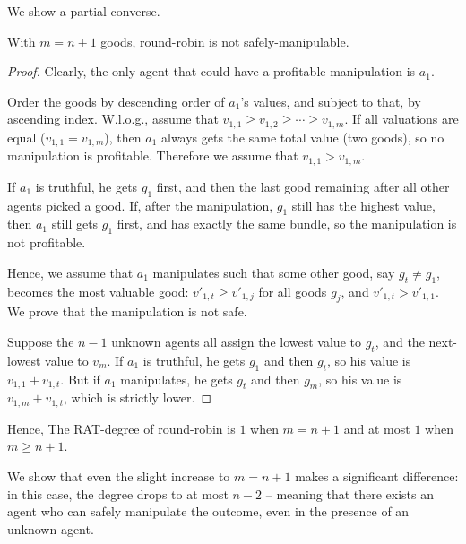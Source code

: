 We show a partial converse.
\begin{lemmarep}
    With $m=n+1$ goods, round-robin is not safely-manipulable.
\end{lemmarep}

\begin{proof}
    Clearly, the only agent that could have a  profitable manipulation is $a_1$. 
    
    Order the goods by descending order of $a_1$'s values, and subject to that, by ascending index. W.l.o.g., assume  that $v_{1,1} \geq v_{1,2} \geq \cdots \geq v_{1,m}$.
    If all valuations are equal ($v_{1,1}=v_{1,m}$), then $a_1$ always gets the same total value (two goods), so no manipulation is profitable. Therefore we assume that $v_{1,1}>v_{1,m}$.
    
    If $a_1$ is truthful, he gets $g_1$ first, and then the last good remaining after all other agents picked a good.
    If, after the manipulation, $g_1$ still has the highest value, then $a_1$ still gets $g_1$ first, and has exactly the same bundle, so the manipulation is not profitable. 
    
    Hence, we assume that $a_1$ manipulates such that some other good, say $g_t\neq g_1$, becomes the most valuable good: $v'_{1,t}\geq v'_{1,j}$ for all goods $g_j$, and $v'_{1,t} > v'_{1,1}$. We prove that the manipulation is not safe.

    Suppose the $n-1$ unknown agents all assign the lowest value to $g_t$, and the next-lowest value to $v_m$.
    If $a_1$ is truthful, he gets $g_1$ and then $g_t$, so his value is $v_{1,1}+v_{1,t}$.
    But if $a_1$ manipulates, he gets $g_t$ and then $g_m$, so his value is $v_{1,m}+v_{1,t}$, which is strictly lower.
\end{proof}

Hence, 
    The RAT-degree of round-robin is $1$ when $m=n+1$ and at most $1$ when $m\geq n+1$.

\iffalse
We show that even the slight increase to $m=n+1$ makes a significant difference: in this case, the degree drops to at most $n-2$ -- meaning that there exists an agent who can safely manipulate the outcome, even in the presence of an unknown agent.


    
